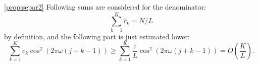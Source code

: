 \documentclass[12pt,a4paper,fleqn,leqno]{article}
\begin{document}
\begin{proof5}{\ref{prop:separ2}}
Following sums are considered for the denominator:
\begin{equation*}
\sum_{k=1}^K \hat c_k = N / L
\end{equation*}
by definition, and the following part is just estimated lower:
\begin{equation*}
\sum_{k=1}^K \hat c_k\cos^2(2 \pi \omega (j + k - 1)) \ge \sum_{k=1}^K \frac{1}{L}\cos^2(2 \pi \omega (j + k - 1)) = O \left(\frac{K}{L} \right).
\end{equation*}
\end{proof5}
\end{document}
